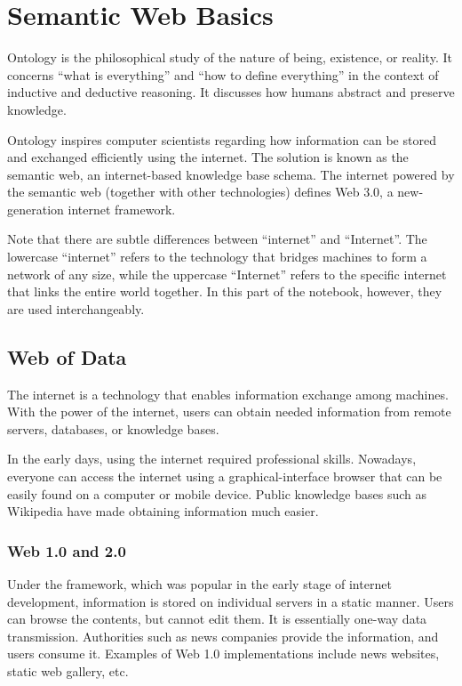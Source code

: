 \chapter{Semantic Web Basics} \label{ch:briefintrosemanticweb}

Ontology is the philosophical study of the nature of being, existence, or reality. It concerns ``what is everything'' and ``how to define everything'' in the context of inductive and deductive reasoning. It discusses how humans abstract and preserve knowledge.

Ontology inspires computer scientists regarding how information can be stored and exchanged efficiently using the internet. The solution is known as the semantic web, an internet-based knowledge base schema. The internet powered by the semantic web (together with other technologies) defines Web 3.0, a new-generation internet framework.

Note that there are subtle differences between ``internet'' and ``Internet''. The lowercase ``internet'' refers to the technology that bridges machines to form a network of any size, while the uppercase ``Internet'' refers to the specific internet that links the entire world together. In this part of the notebook, however, they are used interchangeably.

\section{Web of Data}

The internet is a technology that enables information exchange among machines. With the power of the internet, users can obtain needed information from remote servers, databases, or knowledge bases.

In the early days, using the internet required professional skills. Nowadays, everyone can access the internet using a graphical-interface browser that can be easily found on a computer or mobile device. Public knowledge bases such as Wikipedia have made obtaining information much easier.

\subsection{Web 1.0 and 2.0}

Under the  framework, which was popular in the early stage of internet development, information is stored on individual servers in a static manner. Users can browse the contents, but cannot edit them. It is essentially one-way data transmission. Authorities such as news companies provide the information, and users consume it. Examples of Web 1.0 implementations include news websites, static web gallery, etc.

